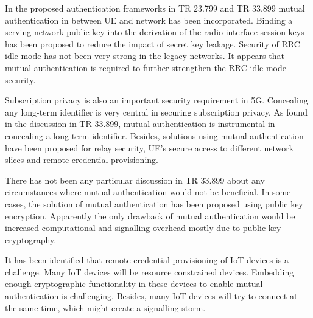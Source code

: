 \documentclass[lnicst,sechang,a4paper]{svmultln}
\begin{document}
In the proposed authentication frameworks in TR 23.799 and TR 33.899 mutual authentication in between UE and network has been incorporated. Binding a serving network public key into the derivation of the radio interface session keys has been proposed to reduce the impact of secret key leakage. Security of RRC idle mode has not been very strong in the legacy networks. It appears that mutual authentication is required to further strengthen the RRC idle mode security.

Subscription privacy is also an important security requirement in 5G. Concealing any long-term  identifier is very central in securing subscription privacy. As found in the discussion in TR 33.899, mutual authentication is instrumental in concealing a long-term identifier. Besides, solutions using mutual authentication have been proposed for relay security, UE's secure access to different network slices and remote credential provisioning.

There has not been any particular discussion in TR 33.899 about any circumstances where mutual authentication would not be beneficial. In some cases, the solution of mutual authentication has been proposed using public key encryption. Apparently the only drawback of mutual authentication would be  increased computational and signalling overhead mostly due to public-key cryptography.

It has been identified that remote credential provisioning of IoT devices is a challenge. Many IoT devices will be resource constrained devices. Embedding enough cryptographic functionality in these devices to enable mutual authentication is challenging. Besides, many IoT devices will try to connect at the same time, which might create a signalling storm.
\end{document}
